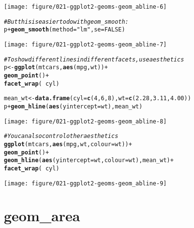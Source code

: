 \documentclass[a4paper,titlepage]{tufte-handout}\usepackage[]{graphicx}\usepackage[]{color}
\makeatletter
\def\maxwidth{ %
  \ifdim\Gin@nat@width>\linewidth
    \linewidth
  \else
    \Gin@nat@width
  \fi
}
\newcommand{\hlnum}[1]{\textcolor[rgb]{0.686,0.059,0.569}{#1}}%
\newcommand{\hlstr}[1]{\textcolor[rgb]{0.192,0.494,0.8}{#1}}%
\newcommand{\hlcom}[1]{\textcolor[rgb]{0.678,0.584,0.686}{\textit{#1}}}%
\newcommand{\hlopt}[1]{\textcolor[rgb]{0,0,0}{#1}}%
\newcommand{\hlstd}[1]{\textcolor[rgb]{0.345,0.345,0.345}{#1}}%
\newcommand{\hlkwb}[1]{\textcolor[rgb]{0.69,0.353,0.396}{#1}}%
\newcommand{\hlkwc}[1]{\textcolor[rgb]{0.333,0.667,0.333}{#1}}%
\newcommand{\hlkwd}[1]{\textcolor[rgb]{0.737,0.353,0.396}{\textbf{#1}}}%
\newenvironment{kframe}{%
 \def\at@end@of@kframe{}%
 \ifinner\ifhmode%
  \def\at@end@of@kframe{\end{minipage}}%
  \begin{minipage}{\columnwidth}%
 \fi\fi%
 \def\FrameCommand##1{\hskip\@totalleftmargin \hskip-\fboxsep
 \colorbox{shadecolor}{##1}\hskip-\fboxsep
     \hskip-\linewidth \hskip-\@totalleftmargin \hskip\columnwidth}%
 \MakeFramed {\advance\hsize-\width
   \@totalleftmargin\z@ \linewidth\hsize
   \@setminipage}}%
 {\par\unskip\endMakeFramed%
 \at@end@of@kframe}
\newenvironment{knitrout}{}{} %
\makeatother
\begin{document}
\begin{knitrout}
\texttt{[image: figure/021-ggplot2-geoms-geom\_abline-6]} 
\begin{kframe}\begin{alltt}
\hlcom{# But this is easier to do with geom_smooth:}
\hlstd{p} \hlopt{+} \hlkwd{geom_smooth}\hlstd{(}\hlkwc{method} \hlstd{=} \hlstr{"lm"}\hlstd{,} \hlkwc{se} \hlstd{=} \hlnum{FALSE}\hlstd{)}
\end{alltt}
\end{kframe}
\texttt{[image: figure/021-ggplot2-geoms-geom\_abline-7]} 
\begin{kframe}\begin{alltt}
\hlcom{# To show different lines in different facets, use aesthetics}
\hlstd{p} \hlkwb{<-} \hlkwd{ggplot}\hlstd{(mtcars,} \hlkwd{aes}\hlstd{(mpg, wt))} \hlopt{+}
  \hlkwd{geom_point}\hlstd{()} \hlopt{+}
  \hlkwd{facet_wrap}\hlstd{(}\hlopt{~} \hlstd{cyl)}

\hlstd{mean_wt} \hlkwb{<-} \hlkwd{data.frame}\hlstd{(}\hlkwc{cyl} \hlstd{=} \hlkwd{c}\hlstd{(}\hlnum{4}\hlstd{,} \hlnum{6}\hlstd{,} \hlnum{8}\hlstd{),} \hlkwc{wt} \hlstd{=} \hlkwd{c}\hlstd{(}\hlnum{2.28}\hlstd{,} \hlnum{3.11}\hlstd{,} \hlnum{4.00}\hlstd{))}
\hlstd{p} \hlopt{+} \hlkwd{geom_hline}\hlstd{(}\hlkwd{aes}\hlstd{(}\hlkwc{yintercept} \hlstd{= wt), mean_wt)}
\end{alltt}
\end{kframe}
\texttt{[image: figure/021-ggplot2-geoms-geom\_abline-8]} 
\begin{kframe}\begin{alltt}
\hlcom{# You can also control other aesthetics}
\hlkwd{ggplot}\hlstd{(mtcars,} \hlkwd{aes}\hlstd{(mpg, wt,} \hlkwc{colour} \hlstd{= wt))} \hlopt{+}
  \hlkwd{geom_point}\hlstd{()} \hlopt{+}
  \hlkwd{geom_hline}\hlstd{(}\hlkwd{aes}\hlstd{(}\hlkwc{yintercept} \hlstd{= wt,} \hlkwc{colour} \hlstd{= wt), mean_wt)} \hlopt{+}
  \hlkwd{facet_wrap}\hlstd{(}\hlopt{~} \hlstd{cyl)}
\end{alltt}
\end{kframe}
\texttt{[image: figure/021-ggplot2-geoms-geom\_abline-9]} 

\end{knitrout}


\section{geom\_area}
\end{document}
